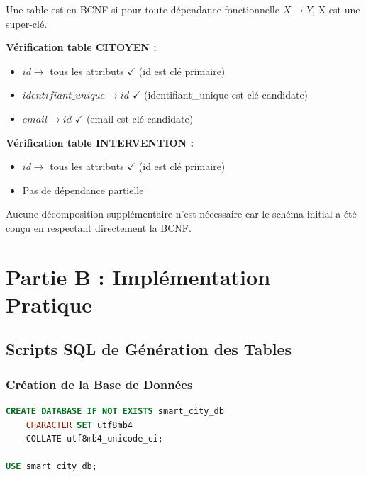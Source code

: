 \documentclass[12pt,a4paper]{article}
\begin{document}
Une table est en BCNF si pour toute dépendance fonctionnelle $X \rightarrow Y$, X est une super-clé.

\textbf{Vérification table CITOYEN :}
\begin{itemize}
    \item $id \rightarrow$ tous les attributs $\checkmark$ (id est clé primaire)
    \item $identifiant\_unique \rightarrow id$ $\checkmark$ (identifiant\_unique est clé candidate)
    \item $email \rightarrow id$ $\checkmark$ (email est clé candidate)
\end{itemize}

\textbf{Vérification table INTERVENTION :}
\begin{itemize}
    \item $id \rightarrow$ tous les attributs $\checkmark$ (id est clé primaire)
    \item Pas de dépendance partielle
\end{itemize}

\begin{center}
\end{center}

Aucune décomposition supplémentaire n'est nécessaire car le schéma initial a été conçu en respectant directement la BCNF.

\section{Partie B : Implémentation Pratique}

\subsection{Scripts SQL de Génération des Tables}

\subsubsection{Création de la Base de Données}

\begin{lstlisting}[language=SQL]
CREATE DATABASE IF NOT EXISTS smart_city_db
    CHARACTER SET utf8mb4
    COLLATE utf8mb4_unicode_ci;

USE smart_city_db;
\end{lstlisting}
\end{document}

